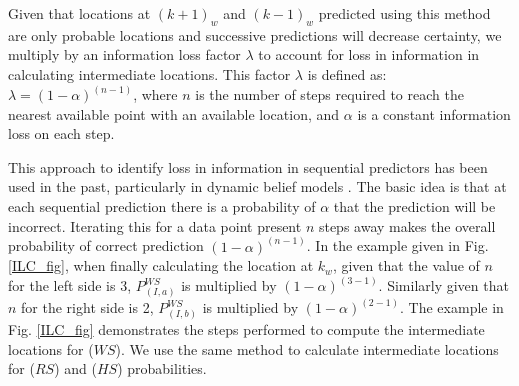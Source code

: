 


Given that locations at $(k+1)_w$ and $(k-1)_w$ predicted using this method are only probable locations and successive predictions will decrease certainty, we multiply by an information loss factor $\lambda$ to account for loss in information in calculating intermediate locations. This factor $\lambda$ is defined as: $\lambda=(1-\alpha)^{(n-1)}$, where $n$ is the number of steps required to reach the nearest available point with an available location, and $\alpha$ is a constant information loss on each step. 

This approach to identify loss in information in sequential predictors has been used in the past, particularly in dynamic belief models \cite{140}. The basic idea is that at each sequential prediction there is a probability of $\alpha$ that the prediction will be incorrect. Iterating this for a data point present $n$ steps away makes the overall probability of correct prediction $(1-\alpha)^{(n-1)}$. In the example given in Fig. \ref{ILC_fig}, when finally calculating the location at $k_w$, given that the value of $n$ for the left side is 3, $P_{(I,a)}^{WS}$ is multiplied by $(1-\alpha)^{(3-1)}$. Similarly given that $n$ for the right side is 2, $P_{(I,b)}^{WS}$ is multiplied by $(1-\alpha)^{(2-1)}$. The example in Fig. \ref{ILC_fig} demonstrates the steps performed to compute the intermediate locations for ($WS$). We use the same method to calculate intermediate locations for ($RS$) and ($HS$) probabilities.

